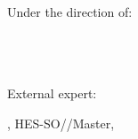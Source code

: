 \begin{titlepage}
{\begin{flushright}
		{
		\large Under the direction of: \\ 
		\Supervisor \\
		\SupervisorSchool \\
		\SupervisorResearchUnit \\[0.5cm]
		}
		
		{
		\large External expert: \\
		\Expert
		}
		
		\vfill
		
		{\large \Locality, HES-SO//Master, \Date}
		
	\end{flushright}		
}
\end{titlepage}